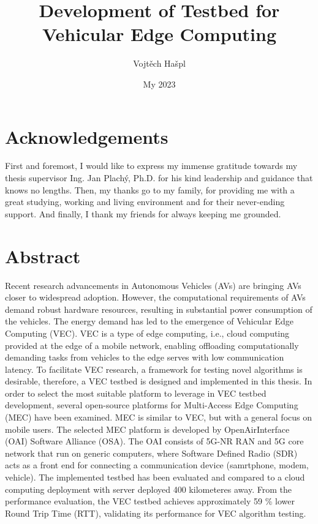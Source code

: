 \documentclass[12pt,a4paper,twoside]{report}
\title {Development of Testbed for Vehicular Edge Computing}
\author{Vojtěch Hašpl}
\date{My 2023}
\begin{document}
\maketitle




\makestatement




\chapter*{Acknowledgements}
First and foremost, I would like to express my immense gratitude towards my thesis supervisor Ing. Jan Plachý, Ph.D. for his kind leadership and guidance that knows no lengths. Then, my thanks go to my family, for providing me with a great studying, working and living environment and for their never-ending support. And finally, I thank my friends for always keeping me grounded. 


\chapter*{Abstract}
Recent research advancements in Autonomous Vehicles (AVs) are bringing AVs closer to widespread adoption. However, the computational requirements of AVs demand robust hardware resources, resulting in substantial power consumption of the vehicles. The energy demand has led to the emergence of Vehicular Edge Computing (VEC). VEC is a type of edge computing, i.e., cloud computing provided at the edge of a mobile network, enabling offloading computationally demanding tasks from vehicles to the edge serves with low communication latency. To facilitate VEC research, a framework for testing novel algorithms is desirable, therefore, a VEC testbed is designed and implemented in this thesis. In order to select the most suitable platform to leverage in VEC testbed development, several open-source platforms for Multi-Access Edge Computing (MEC) have been examined. MEC is similar to VEC, but with a general focus on mobile users. The selected MEC platform is developed by OpenAirInterface (OAI) Software Alliance (OSA). The OAI consists of 5G-NR RAN and 5G core network that run on generic computers, where Software Defined Radio (SDR) acts as a front end for connecting a communication device (samrtphone, modem, vehicle). The implemented testbed has been evaluated and compared to a cloud computing deployment with  server deployed 400 kilometeres away. From the performance evaluation, the VEC testbed achieves approximately 59 \% lower Round Trip Time (RTT), validating its performance for VEC algorithm testing.
	
\end{document}
